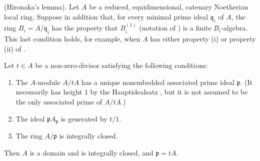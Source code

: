 \begin{proposition}[5.12.8]
\label{IV.5.12.8}
{\normalfont(Hironaka's lemma).}
Let $A$ be a reduced, equidimensional, catenary Noetherian local
ring.  Suppose in addition that, for every minimal prime ideal
$\mathfrak q_i$ of $A$, the ring
$B_i=A/\mathfrak q_i$ has the property that $B_i^{(1)}$
(notation of ) is a finite $B_i$-algebra.  This
last condition holds, for example, when $A$ has either property
{\rm(i)} or property {\rm(ii)} of .

Let $t\in A$ be a non-zero-divisor satisfying the following
conditions:
\begin{enumerate}[{\rm(i)}]
  \item The $A$-module $A/tA$ has a unique nonembedded associated
  prime ideal $\mathfrak p$.  (It necessarily has height $1$ by
  the Hauptidealsatz , but it is not assumed to
  be the only associated prime of $A/tA$.)
  \item The ideal $\mathfrak pA_{\mathfrak p}$ is generated by
  $t/1$.
  \item The ring $A/\mathfrak p$ is integrally closed.
\end{enumerate}
Then $A$ is a domain and is integrally closed, and
$\mathfrak p=tA$.
\end{proposition}

